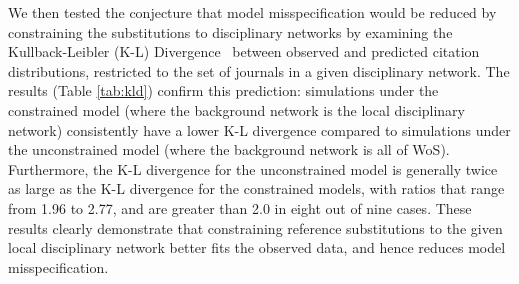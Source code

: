 \documentclass[NETN]{stjour}
\begin{document}
 We then tested the conjecture that model misspecification would be reduced by constraining the substitutions to  disciplinary networks by examining the Kullback-Leibler (K-L) Divergence~\citep{kullback_information_1951} between observed and predicted citation distributions, restricted to  the set of journals in a given disciplinary network.  
The results (Table \ref{tab:kld}) confirm this prediction: simulations under the constrained model 
(where the background network is the local disciplinary network) consistently have a lower K-L divergence compared to simulations under the unconstrained model  (where the background network is all of WoS).  Furthermore, the K-L divergence for  the unconstrained model  is generally twice as large as the K-L divergence for the constrained models, with ratios that range from 1.96 to 2.77,  and are greater than 2.0 in eight out of nine cases. These results clearly demonstrate that constraining reference substitutions to the given local disciplinary network better fits the observed data, and hence reduces model misspecification.
\end{document}
